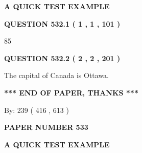 \documentclass[12pt]{article}
\begin{document}
   
 \vspace{0.2in}
{\LARGE {\textbf{ A QUICK TEST EXAMPLE}}}
   
   
  
\vspace{0.2in}
  
{\textbf{\Large{QUESTION
532.1 
 ( 1 , 1 , 101 )
}}}
  
  
 
 
\noindent{}

85
 
 
  
\vspace{0.2in}
  
{\textbf{\Large{QUESTION
532.2 
 ( 2 , 2 , 201 )
}}}
  
  
 
 
\noindent{}
 
 
The capital of Canada is Ottawa.
 
 
 
 
   
   
 \vspace{0.2in}
 
   
   
   
   
\vspace{1.0in} 
{\textbf{\large{ *** END OF PAPER, THANKS *** }}} 
   
   
\hspace{1.0in} By: 
 239 ( 416 ,  613 )
   
   
   
   
\newpage 
\setcounter{page}{ 
   533001 } 
   
   
   
   
 {\textbf{ \Large{ PAPER NUMBER  533  }}}
   
   
\vspace{0.2in}
   
   
   
   
   
   
 \vspace{0.2in}
{\LARGE {\textbf{ A QUICK TEST EXAMPLE}}}
   
   
  
\vspace{0.2in}
  
\end{document}
